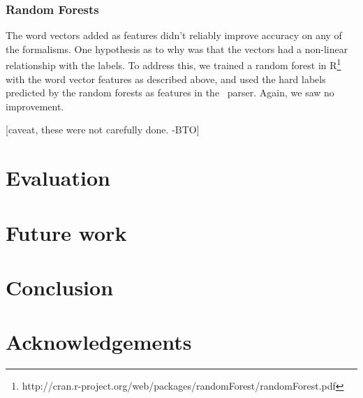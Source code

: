 \documentclass[11pt]{article}
\newcommand{\bocomment}[1]{\textcolor{Bittersweet}{[#1 -BTO]}}
\begin{document}
\subsubsection{Random Forests}
The word vectors added as features didn't reliably improve accuracy on any of the formalisms. One hypothesis as to why was that the vectors had a non-linear relationship with the labels. To address this, we trained a random forest in R\footnote{http://cran.r-project.org/web/packages/randomForest/randomForest.pdf} with the word vector features as described above, and used the hard labels predicted by the random forests as features in the \logitedge\ parser. Again, we saw no improvement.

\bocomment{caveat, these were not carefully done.}


\section{Evaluation}
\label{s:datasplits}

\section{Future work}

\section{Conclusion}

\nocite{flanigan-etal:ACL2014}



\section*{Acknowledgements}



\end{document}
